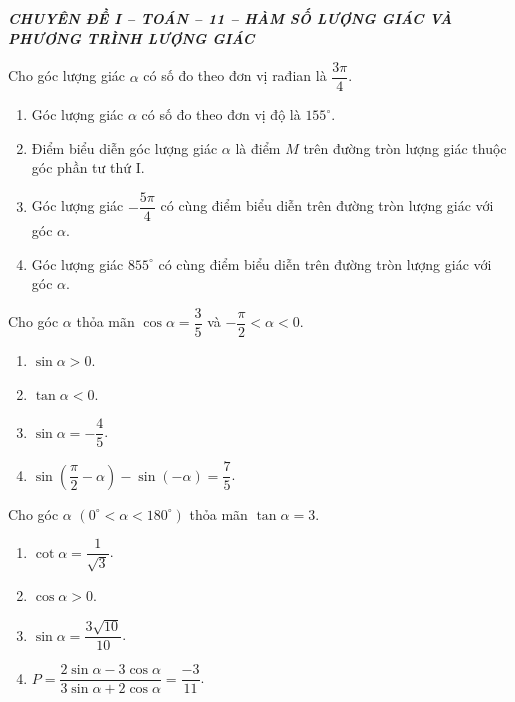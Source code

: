 \documentclass[12pt,a4paper]{article}
\renewcommand{\baselinestretch}{1.12}
\begin{document}
\begingroup
\renewcommand{\baselinestretch}{1.03}\selectfont
\begin{center}
  {\small\bfseries\itshape CHUYÊN ĐỀ I -- TOÁN -- 11 -- HÀM SỐ LƯỢNG GIÁC VÀ PHƯƠNG TRÌNH LƯỢNG GIÁC}
\end{center}

\begin{questions}[resume,itemsep=5pt,topsep=3pt]
  \item Cho góc lượng giác $\alpha$ có số đo theo đơn vị rađian là $\dfrac{3\pi}{4}$.
  \begin{enumerate}[label=\alph*),leftmargin=7mm,labelsep=1mm,itemsep=3pt,topsep=3pt,parsep=0pt]
    \item Góc lượng giác $\alpha$ có số đo theo đơn vị độ là $155^\circ$.
    \item Điểm biểu diễn góc lượng giác $\alpha$ là điểm $M$ trên đường tròn lượng giác thuộc góc phần tư thứ I.
    \item Góc lượng giác $-\dfrac{5\pi}{4}$ có cùng điểm biểu diễn trên đường tròn lượng giác với góc $\alpha$.
    \item Góc lượng giác $855^\circ$ có cùng điểm biểu diễn trên đường tròn lượng giác với góc $\alpha$.
  \end{enumerate}

  \item Cho góc $\alpha$ thỏa mãn $\cos\alpha=\dfrac{3}{5}$ và $-\dfrac{\pi}{2}<\alpha<0$.
  \begin{enumerate}[label=\alph*),leftmargin=7mm,labelsep=1mm,itemsep=3pt,topsep=3pt,parsep=0pt]
    \item $\sin\alpha>0$.
    \item $\tan\alpha<0$.
    \item $\sin\alpha=-\dfrac{4}{5}$.
    \item $\sin\left(\dfrac{\pi}{2}-\alpha\right)-\sin(-\alpha)=\dfrac{7}{5}$.
  \end{enumerate}

  \item Cho góc $\alpha$ $(0^\circ<\alpha<180^\circ)$ thỏa mãn $\tan\alpha=3$.
  \begin{enumerate}[label=\alph*),leftmargin=7mm,labelsep=1mm,itemsep=3pt,topsep=3pt,parsep=0pt]
    \item $\cot\alpha=\dfrac{1}{\sqrt{3}}$.
    \item $\cos\alpha>0$.
    \item $\sin\alpha=\dfrac{3\sqrt{10}}{10}$.
    \item $P=\dfrac{2\sin\alpha-3\cos\alpha}{3\sin\alpha+2\cos\alpha}=\dfrac{-3}{11}$.
  \end{enumerate}
\end{questions}
\end{document}
